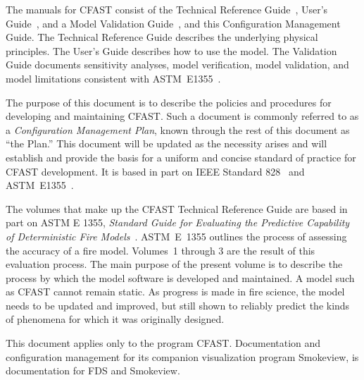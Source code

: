 \documentclass[12pt]{book}
\begin{document}
The manuals for CFAST consist of the Technical Reference Guide~\cite{CFAST_Tech_Guide_7}, User's Guide~\cite{CFAST_Users_Guide_7}, and a Model Validation Guide~\cite{CFAST_Valid_Guide_7}, and this Configuration Management Guide.  The Technical Reference Guide describes the underlying physical principles. The User's Guide describes how to use the model. The Validation Guide documents sensitivity analyses, model verification, model validation, and model limitations consistent with ASTM~E1355~\cite{ASTM:E1355}.

The purpose of this document is to describe the policies and procedures for developing and maintaining CFAST. Such a document is commonly referred to as a {\em Configuration Management Plan}, known through the rest of this document as ``the Plan.'' This document will be updated as the necessity arises and will establish and provide the basis for a uniform and concise standard of practice for CFAST development. It is based in part on IEEE Standard 828~\cite{IEEE-828} and ASTM~E1355~\cite{ASTM:E1355}.

The volumes that make up the CFAST Technical Reference Guide are based in part on ASTM E 1355, {\em Standard Guide for Evaluating the Predictive Capability of Deterministic Fire Models}~\cite{ASTM:E1355}. ASTM~E~1355 outlines the process of assessing the accuracy of a fire model. Volumes~1 through 3 are the result of this evaluation process. The main purpose of the present volume is to describe the process by which the model software is developed and maintained. A model such as CFAST cannot remain static. As progress is made in fire science, the model needs to be updated and improved, but still shown to reliably predict the kinds of
phenomena for which it was originally designed.

This document applies only to the program CFAST. Documentation and configuration management for its companion visualization program Smokeview, is documentation for FDS and Smokeview.




\end{document}
